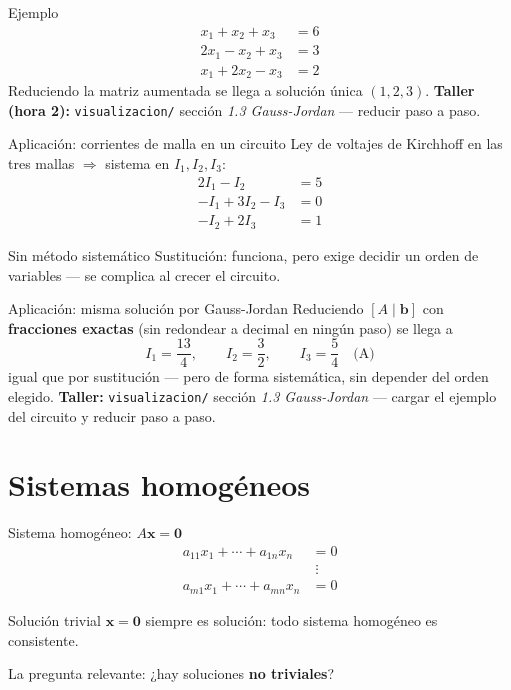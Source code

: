 \documentclass[11pt]{beamer}
\newcommand{\vv}[1]{\mathbf{#1}}
\begin{document}
\begin{frame}{Ejemplo}
  \[
  \begin{aligned}
    x_1+x_2+x_3 &= 6 \\
    2x_1-x_2+x_3 &= 3 \\
    x_1+2x_2-x_3 &= 2
  \end{aligned}
  \]
  Reduciendo la matriz aumentada se llega a solución única $(1,2,3)$.
  \vfill
  \textbf{Taller (hora 2):} \texttt{visualizacion/} sección \emph{1.3 Gauss-Jordan} --- reducir
  paso a paso.
\end{frame}

\begin{frame}{Aplicación: corrientes de malla en un circuito}
  Ley de voltajes de Kirchhoff en las tres mallas $\Rightarrow$ sistema en $I_1,I_2,I_3$:
  \[
  \begin{aligned}
    2I_1 - I_2 &= 5 \\
    -I_1 + 3I_2 - I_3 &= 0 \\
    -I_2 + 2I_3 &= 1
  \end{aligned}
  \]
  \begin{alertblock}{Sin método sistemático}
    Sustitución: funciona, pero exige decidir un orden de variables --- se complica al crecer
    el circuito.
  \end{alertblock}
\end{frame}

\begin{frame}{Aplicación: misma solución por Gauss-Jordan}
  Reduciendo $[A\mid\vv{b}]$ con \textbf{fracciones exactas} (sin redondear a decimal en ningún
  paso) se llega a
  \[
    I_1=\frac{13}{4}, \qquad I_2=\frac{3}{2}, \qquad I_3=\frac{5}{4} \quad \text{(A)}
  \]
  igual que por sustitución --- pero de forma sistemática, sin depender del orden elegido.
  \vfill
  \textbf{Taller:} \texttt{visualizacion/} sección \emph{1.3 Gauss-Jordan} --- cargar el ejemplo
  del circuito y reducir paso a paso.
\end{frame}

\section{Sistemas homogéneos}

\begin{frame}{Sistema homogéneo: \texorpdfstring{$A\vv{x}=\vv{0}$}{Ax=0}}
  \[
  \begin{aligned}
    a_{11}x_1+\cdots+a_{1n}x_n &= 0 \\
    &\;\vdots \\
    a_{m1}x_1+\cdots+a_{mn}x_n &= 0
  \end{aligned}
  \]
  \begin{alertblock}{Solución trivial}
    $\vv{x}=\vv{0}$ siempre es solución: todo sistema homogéneo es consistente.
  \end{alertblock}
  La pregunta relevante: ¿hay soluciones \textbf{no triviales}?
\end{frame}
\end{document}
